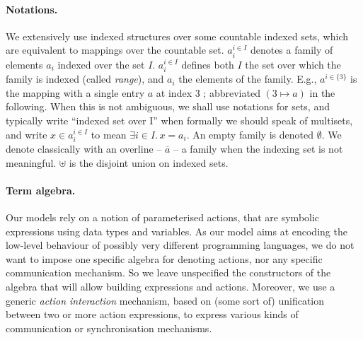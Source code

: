 \documentclass{lncs/llncs}
\begin{document}
\paragraph*{Notations.}
We extensively use indexed structures
over some countable indexed sets, which are equivalent to mappings over
the countable set. %
$a_i^{i\in I}$
denotes a family of elements $a_i$ indexed over the
set $I$. %
$a_i^{i\in I}$ defines both $I$ the set over which the family is
indexed (called \emph{range}), and $a_i$ the elements of the family.
E.g., $a^{i\in\{3\}}$ is the mapping with a single entry $a$ at index
$3$ ; abbreviated $(3\mapsto a)$ in the following.
When this is not
ambiguous, we shall use notations for sets, and typically write
``indexed set over I'' when formally we should speak of multisets, and
write $x\in a_i^{i\in I}$ to mean $\exists i\in I.\, x=a_i$.  An empty
family is denoted $\emptyset$. We
denote classically with an overline -- $\overline{a}$  -- a family when the indexing set 
is
not meaningful.  $\uplus$ is the disjoint union on
indexed sets.

\paragraph*{Term algebra.}
Our models rely on a notion of parameterised actions, that are
symbolic expressions using data types and variables. As our model aims
at encoding the low-level behaviour of possibly very different
programming languages, we do not want to impose one specific algebra
for denoting actions, nor any specific communication mechanism. So we
leave unspecified the constructors of the algebra that will allow building
expressions and actions. Moreover, we use a generic {\em action interaction}
mechanism, based on (some sort of) unification between two or more action
expressions, to express various kinds of communication or
synchronisation mechanisms.
\end{document}

